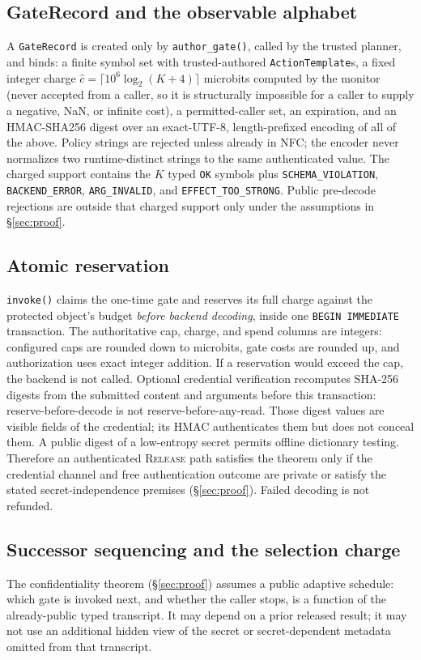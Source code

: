 \documentclass[conference,compsoc]{IEEEtran}
\begin{document}
\subsection{GateRecord and the observable alphabet}
A \texttt{GateRecord} is created only by \texttt{author\_gate()}, called
by the trusted planner, and binds: a finite symbol set with
trusted-authored \texttt{ActionTemplate}s, a fixed integer charge
$\widehat c=\lceil 10^6\log_2(K+4)\rceil$ microbits computed by the
monitor (never accepted from a caller, so it is structurally impossible
for a caller to supply a negative, NaN, or infinite cost), a
permitted-caller set, an expiration, and an HMAC-SHA256 digest over an
exact-UTF-8, length-prefixed encoding of all of the above. Policy
strings are rejected unless already in NFC; the encoder never
normalizes two runtime-distinct strings to the same authenticated value.
The charged support contains the $K$ typed \texttt{OK} symbols plus
\texttt{SCHEMA\_VIOLATION}, \texttt{BACKEND\_ERROR},
\texttt{ARG\_INVALID}, and \texttt{EFFECT\_TOO\_STRONG}. Public pre-decode
rejections are outside that charged support only under the assumptions in
\S\ref{sec:proof}.

\subsection{Atomic reservation}
\texttt{invoke()} claims the one-time gate and reserves its full charge
against the protected object's budget \emph{before backend decoding},
inside one \texttt{BEGIN IMMEDIATE} transaction. The authoritative cap,
charge, and spend columns are integers: configured caps are rounded down to
microbits, gate costs are rounded up, and authorization uses exact integer
addition. If a reservation would exceed the cap, the backend is not called.
Optional credential verification recomputes SHA-256 digests from the submitted
content and arguments before this transaction: reserve-before-decode is not
reserve-before-any-read. Those digest values are visible fields of the
credential; its HMAC authenticates them but does not conceal them. A public
digest of a low-entropy secret permits offline dictionary testing. Therefore an
authenticated \textsc{Release} path satisfies the theorem only if the
credential channel and free authentication outcome are private or satisfy the
stated secret-independence premises (\S\ref{sec:proof}). Failed decoding is not
refunded.

\subsection{Successor sequencing and the selection charge}
\label{sec:sequencing}
The confidentiality theorem (\S\ref{sec:proof}) assumes a public adaptive
schedule: which gate is invoked next, and whether the caller stops, is a
function of the already-public typed transcript. It may depend on a prior
released result; it may not use an additional hidden view of the secret or
secret-dependent metadata omitted from that transcript.
\end{document}
